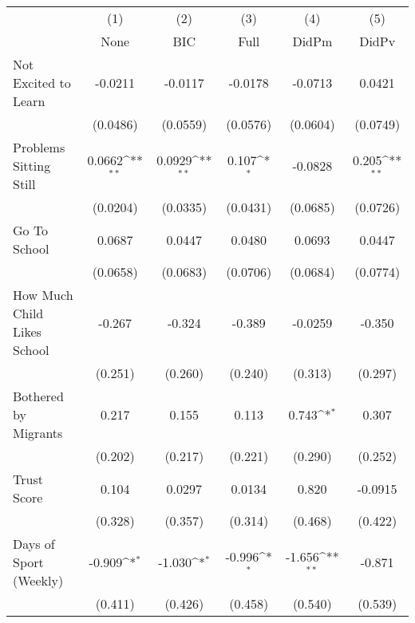 {
\def\sym#1{\ifmmode^{#1}\else\(^{#1}\)\fi}
\begin{tabular}{l*{5}{c}}
\toprule
            &\multicolumn{1}{c}{(1)}&\multicolumn{1}{c}{(2)}&\multicolumn{1}{c}{(3)}&\multicolumn{1}{c}{(4)}&\multicolumn{1}{c}{(5)}\\
            &\multicolumn{1}{c}{None}&\multicolumn{1}{c}{BIC}&\multicolumn{1}{c}{Full}&\multicolumn{1}{c}{DidPm}&\multicolumn{1}{c}{DidPv}\\
\midrule
Not Excited to Learn&     -0.0211         &     -0.0117         &     -0.0178         &     -0.0713         &      0.0421         \\
            &    (0.0486)         &    (0.0559)         &    (0.0576)         &    (0.0604)         &    (0.0749)         \\
\addlinespace
Problems Sitting Still&      0.0662\sym{**} &      0.0929\sym{**} &       0.107\sym{*}  &     -0.0828         &       0.205\sym{**} \\
            &    (0.0204)         &    (0.0335)         &    (0.0431)         &    (0.0685)         &    (0.0726)         \\
\addlinespace
Go To School&      0.0687         &      0.0447         &      0.0480         &      0.0693         &      0.0447         \\
            &    (0.0658)         &    (0.0683)         &    (0.0706)         &    (0.0684)         &    (0.0774)         \\
\addlinespace
How Much Child Likes School&      -0.267         &      -0.324         &      -0.389         &     -0.0259         &      -0.350         \\
            &     (0.251)         &     (0.260)         &     (0.240)         &     (0.313)         &     (0.297)         \\
\addlinespace
Bothered by Migrants&       0.217         &       0.155         &       0.113         &       0.743\sym{*}  &       0.307         \\
            &     (0.202)         &     (0.217)         &     (0.221)         &     (0.290)         &     (0.252)         \\
\addlinespace
Trust Score &       0.104         &      0.0297         &      0.0134         &       0.820         &     -0.0915         \\
            &     (0.328)         &     (0.357)         &     (0.314)         &     (0.468)         &     (0.422)         \\
\addlinespace
Days of Sport (Weekly)&      -0.909\sym{*}  &      -1.030\sym{*}  &      -0.996\sym{*}  &      -1.656\sym{**} &      -0.871         \\
            &     (0.411)         &     (0.426)         &     (0.458)         &     (0.540)         &     (0.539)         \\
\bottomrule
\end{tabular}
}
